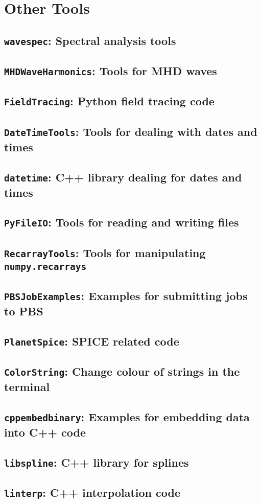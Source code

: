 \chapter{Other Tools}

	
	\section{\texttt{wavespec}: Spectral analysis tools}
	\section{\texttt{MHDWaveHarmonics}: Tools for MHD waves}
	\section{\texttt{FieldTracing}: Python field tracing code}
	\section{\texttt{DateTimeTools}: Tools for dealing with dates and times}
	\section{\texttt{datetime}: C++ library dealing for dates and times}
	\section{\texttt{PyFileIO}: Tools for reading and writing files}
	\section{\texttt{RecarrayTools}: Tools for manipulating \texttt{numpy.recarrays}}	
	\section{\texttt{PBSJobExamples}: Examples for submitting jobs to PBS}
	\section{\texttt{PlanetSpice}: SPICE related code}
	\section{\texttt{ColorString}: Change colour of strings in the terminal}
	\section{\texttt{cppembedbinary}: Examples for embedding data into C++ code}
	\section{\texttt{libspline}: C++ library for splines}
	\section{\texttt{linterp}: C++ interpolation code}